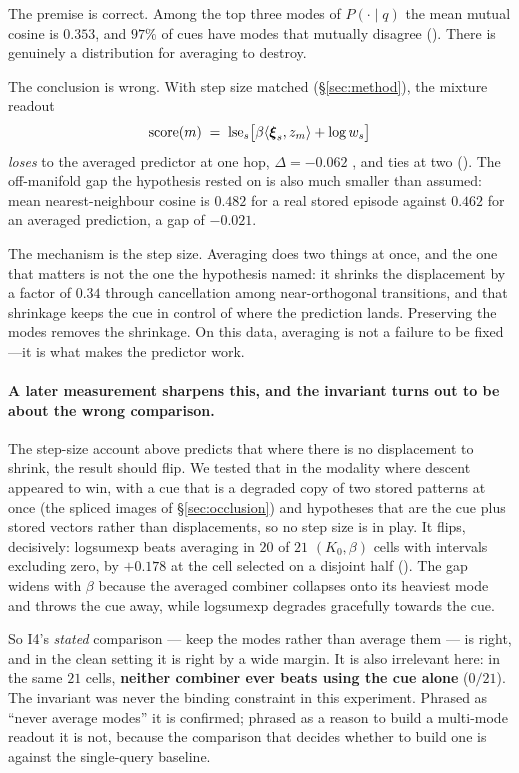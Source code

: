The premise is correct. Among the top three modes of $P(\cdot\mid q)$ the mean mutual cosine
is $0.353$, and $97\%$ of cues have modes that mutually disagree (). There is
genuinely a distribution for averaging to destroy.

The conclusion is wrong. With step size matched (\S\ref{sec:method}), the mixture readout
\[
\mathrm{score}(m) \;=\; \operatorname{lse}_s\!\big[\beta\langle \boldsymbol{\xi}_s, z_m\rangle + \log w_s\big]
\]
\emph{loses} to the averaged predictor at one hop, $\Delta = -0.062$ , and
ties at two (). The off-manifold gap the hypothesis rested on is also much smaller than assumed:
mean nearest-neighbour cosine is $0.482$ for a real stored episode against $0.462$ for an
averaged prediction, a gap of $-0.021$.

The mechanism is the step size. Averaging does two things at once, and the one that matters
is not the one the hypothesis named: it shrinks the displacement by a factor of $0.34$
through cancellation among near-orthogonal transitions, and that shrinkage keeps the cue in
control of where the prediction lands. Preserving the modes removes the shrinkage. On this
data, averaging is not a failure to be fixed---it is what makes the predictor work.

\paragraph{A later measurement sharpens this, and the invariant turns out to be about the
wrong comparison.} The step-size account above predicts that where there is no displacement
to shrink, the result should flip. We tested that in the modality where descent appeared to
win, with a
cue that is a degraded copy of two stored patterns at once (the spliced images of
\S\ref{sec:occlusion}) and hypotheses that are the cue plus stored vectors rather than
displacements, so no step size is in play. It flips, decisively: logsumexp beats averaging
in $20$ of $21$ $(K_0,\beta)$ cells with intervals excluding zero, by $+0.178$
 at the cell selected on a disjoint half (). The gap widens
with $\beta$ because the averaged combiner collapses onto its heaviest mode and throws the
cue away, while logsumexp degrades gracefully towards the cue.

So I4's \emph{stated} comparison --- keep the modes rather than average them --- is right,
and in the clean setting it is right by a wide margin. It is also irrelevant here: in the
same $21$ cells, \textbf{neither combiner ever beats using the cue alone} ($0/21$). The
invariant was never the binding constraint in this experiment. Phrased as ``never average
modes'' it is confirmed; phrased as a reason to build a multi-mode readout it is not,
because the comparison that decides whether to build one is against the single-query
baseline.

